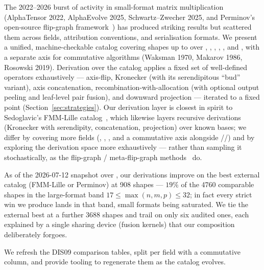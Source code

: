 
The 2022--2026 burst of activity in small-format matrix multiplication
(AlphaTensor 2022, AlphaEvolve 2025, Schwartz--Zwecher 2025, and
Perminov's open-source flip-graph
framework~\cite{perminov2026fast,perminov2025fast}) has produced
striking results but scattered them across fields, attribution
conventions, and serialisation formats.
We present a unified, machine-checkable catalog covering shapes up to
 over \Rationals, \Integers, \Reals, \Complex,
\Ftwo, and \Fthree, with a separate axis for commutative algorithms
(Waksman 1970, Makarov 1986, Rosowski 2019). Derivation over the
catalog applies a fixed set of well-defined operators exhaustively ---
axis-flip, Kronecker (with its serendipitous ``bud'' variant), axis
concatenation, recombination-with-allocation (with optional output
peeling and leaf-level pair fusion), and downward projection --- iterated to a
fixed point (Section~\ref{sec:strategies}).
Our derivation layer is closest in spirit to Sedoglavic's FMM-Lille
catalog~\cite{fmmlille}, which likewise layers recursive derivations
(Kronecker with serendipity, concatenation, projection) over known bases; we
differ by covering more fields (\Integers, \Ftwo, \Fthree, and a
commutative axis alongside \Rationals/\Reals/\Complex) and by exploring
the derivation space more exhaustively --- rather than sampling it
stochastically, as the flip-graph / meta-flip-graph
methods~\cite{perminov} do.

As of the 2026-07-12 snapshot over \Rationals, our derivations improve
on the best external catalog (FMM-Lille or Perminov) at 908 shapes ---
\(19\%\) of the 4760 comparable shapes in the large-format band
\(17 \le \max(n,m,p) \le 32\); in fact every strict win we produce
lands in that band, small formats being saturated. We tie the external
best at a further 3688 shapes and trail on only six audited ones, each
explained by a single sharing device (fusion kernels) that our
composition deliberately forgoes.

We refresh the DIS09 comparison tables, split per field with a
commutative column, and provide tooling to regenerate them as the
catalog evolves.
